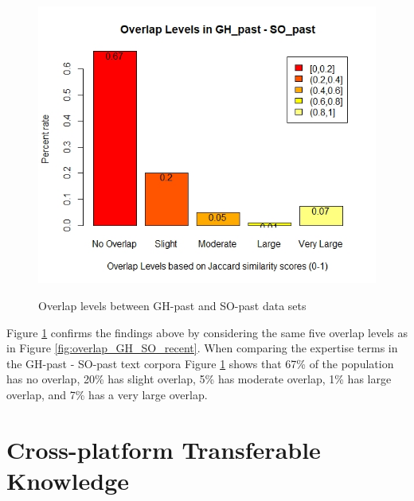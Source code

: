         \begin{figure}
          \centering
          \includegraphics[width=\textwidth]{figures/overlap_SO_GH_past.jpeg}\\
          \caption{Overlap levels between GH-past and SO-past data sets}
          \label{fig:overlap_GH_SO_past}
        \end{figure}
        
        Figure \ref{fig:overlap_GH_SO_past} confirms the findings above by considering the same five overlap levels as in Figure \ref{fig:overlap_GH_SO_recent}. When comparing the expertise terms in the GH-past - SO-past text corpora Figure \ref{fig:overlap_GH_SO_past} shows that 67\% of the population has no overlap, 20\% has slight overlap, 5\% has moderate overlap, 1\% has large overlap, and 7\% has a very large overlap.
        
    
    \section{Cross-platform Transferable Knowledge\label{sec:results_rq3}}
        
